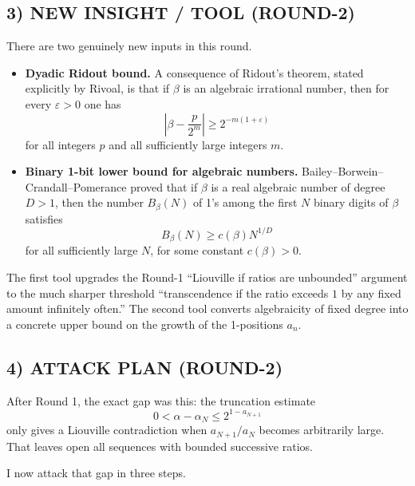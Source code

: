 \subsection*{3) NEW INSIGHT / TOOL (ROUND-2)}
There are two genuinely new inputs in this round.

\begin{itemize}
\item \textbf{Dyadic Ridout bound.} A consequence of Ridout's theorem, stated explicitly by Rivoal, is that if $\beta$ is an algebraic irrational number, then for every $\varepsilon>0$ one has
\[
\left|\beta-\frac{p}{2^m}\right|\ge 2^{-m(1+\varepsilon)}
\]
for all integers $p$ and all sufficiently large integers $m$.

\item \textbf{Binary 1-bit lower bound for algebraic numbers.} Bailey--Borwein--Crandall--Pomerance proved that if $\beta$ is a real algebraic number of degree $D>1$, then the number $B_\beta(N)$ of 1's among the first $N$ binary digits of $\beta$ satisfies
\[
B_\beta(N)\ge c(\beta)N^{1/D}
\]
for all sufficiently large $N$, for some constant $c(\beta)>0$.
\end{itemize}

The first tool upgrades the Round-1 ``Liouville if ratios are unbounded'' argument to the much sharper threshold ``transcendence if the ratio exceeds $1$ by any fixed amount infinitely often.''
The second tool converts algebraicity of fixed degree into a concrete upper bound on the growth of the 1-positions $a_n$.

\subsection*{4) ATTACK PLAN (ROUND-2)}
After Round 1, the exact gap was this: the truncation estimate
\[
0<\alpha-\alpha_N\le 2^{1-a_{N+1}}
\]
only gives a Liouville contradiction when $a_{N+1}/a_N$ becomes arbitrarily large. That leaves open all sequences with bounded successive ratios.

I now attack that gap in three steps.

